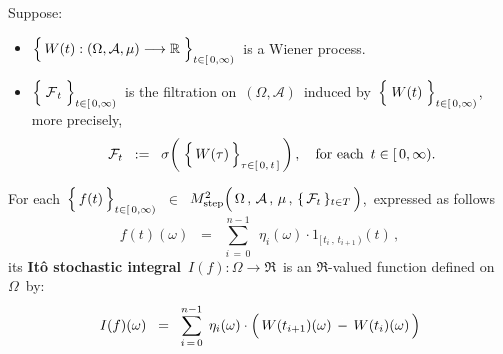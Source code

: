 \vskip 0.5cm
\begin{definition}
\mbox{}
\vskip 0.2cm
\noindent
Suppose:
\begin{itemize}
\item
	$\left\{\,\overset{{\color{white}.}}{W}(t) : (\Omega,\mathcal{A},\mu) \longrightarrow \Re \;\right\}_{t \in[\,0,\infty)}$\,
	is a Wiener process.
\item
	$\left\{\;\overset{{\color{white}.}}{\mathcal{F}}_{t}\;\right\}_{t\in[\,0,\infty)}$\,
	is the filtration on \,$(\Omega,\mathcal{A})$\, induced by
	\,$\left\{\;\overset{{\color{white}.}}{W}(t)\;\right\}_{t\in[\,0,\infty)}$,\,
	more precisely,
	\begin{equation*}
	\mathcal{F}_{t}
	\;\; := \;\;
		\sigma\!\left(\;\left\{\,\overset{{\color{white}.}}{W}(\tau)\,\right\}_{\tau\in[\,0,\,t\,]}\,\right),
	\quad
	\textnormal{for each \,$t \in [\,0,\infty)$}.
	\end{equation*}
\end{itemize}
For each
\,$\left\{\,\overset{{\color{white}.}}{f}(t)\,\right\}_{t\in[\,0,\infty)}$\,
$\in$
\,$M^{2}_{\textnormal{step}}\!
	\left(\,
		\overset{{\color{white}.}}{\Omega} \,,\, \mathcal{A} \,,\, \mu \,,\, \{\,\mathcal{F}_{t}\,\}_{t \in T}
		\,\right)$,\,
expressed as follows
\begin{equation*}
f(t)(\omega)
\;\; = \;\;
	\overset{n-1}{\underset{i\,=\,0}{\sum}}\;\,
	\eta_{i}(\omega) \cdot 1_{[\,t_{i}\,,\,t_{i+1}\,)}(t)\,,
\end{equation*}
its \textbf{It\^{o} stochastic integral}
\,$I(f) : \Omega \longrightarrow \Re$\,
is an $\Re$-valued function defined on \,$\Omega$\, by:
\begin{equation*}
I(f)(\omega)
\;\; = \;\;
	\overset{n-1}{\underset{i\,=\,0}{\sum}}\;\,
	\eta_{i}(\omega) \cdot \left(\, W(t_{i+1})(\omega) \,\overset{{\color{white}.}}{-}\, W(t_{i})(\omega) \,\right)
\end{equation*}
\end{definition}


